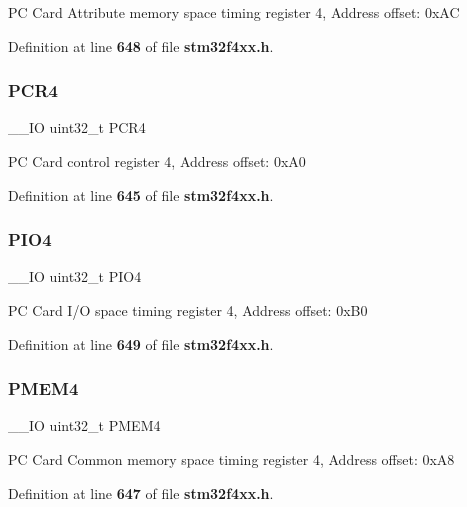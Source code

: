 PC Card Attribute memory space timing register 4, Address offset\+: 0x\+AC 

Definition at line \textbf{ 648} of file \textbf{ stm32f4xx.\+h}.

\mbox{\label{structFSMC__Bank4__TypeDef_a2f02e7acfbd7e549ede84633215eb6a1}} 
\subsubsection{P\+C\+R4}
{\footnotesize\ttfamily \+\_\+\+\_\+\+IO uint32\+\_\+t P\+C\+R4}

PC Card control register 4, Address offset\+: 0x\+A0 

Definition at line \textbf{ 645} of file \textbf{ stm32f4xx.\+h}.

\mbox{\label{structFSMC__Bank4__TypeDef_ac53cd7a08093a4ae8f4de4bcff67a64f}} 
\subsubsection{P\+I\+O4}
{\footnotesize\ttfamily \+\_\+\+\_\+\+IO uint32\+\_\+t P\+I\+O4}

PC Card I/O space timing register 4, Address offset\+: 0x\+B0 

Definition at line \textbf{ 649} of file \textbf{ stm32f4xx.\+h}.

\mbox{\label{structFSMC__Bank4__TypeDef_a3f82cc749845fb0dd7dfa8121d96b663}} 
\subsubsection{P\+M\+E\+M4}
{\footnotesize\ttfamily \+\_\+\+\_\+\+IO uint32\+\_\+t P\+M\+E\+M4}

PC Card Common memory space timing register 4, Address offset\+: 0x\+A8 

Definition at line \textbf{ 647} of file \textbf{ stm32f4xx.\+h}.

